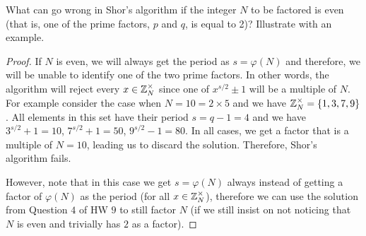 \begin{solution}[label=ques:1c]
  \begin{question}
    What can go wrong in Shor's algorithm if the integer $N$ to be factored is even (that is, one of the prime factors, $p$ and $q$, is equal to 2)?  Illustrate with an example.
  \end{question}
  \tcblower{}
  \begin{proof}
    If $N$ is even, we will always get the period as $s = \varphi(N)$ and therefore, we will be unable to identify one of the two prime factors. In other words, the algorithm will reject every $x \in \mathbb{Z}_N^\times$ since one of $x^{s/2} \pm 1$ will be a multiple of $N$. For example consider the case when $N = 10 = 2\times 5$ and we have $\mathbb{Z}_N^\times = \{1, 3, 7, 9\}$. All elements in this set have their period $s = q - 1 = 4$ and we have $3^{s/2} + 1 = 10$, $7^{s/2} + 1 = 50$, $9^{s/2} - 1 = 80$. In all cases, we get a factor that is a multiple of $N = 10$, leading us to discard the solution. Therefore, Shor's algorithm fails.\par
    However, note that in this case we get $s = \varphi(N)$ always instead of getting a factor of $\varphi(N)$ as the period (for all $x \in \mathbb{Z}_N^\times$), therefore we can use the solution from Question $4$ of HW $9$ to still factor $N$ (if we still insist on not noticing that $N$ is even and trivially has $2$ as a factor).
  \end{proof}
\end{solution}
